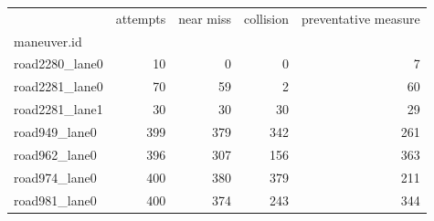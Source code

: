 \begin{tabular}{lrrrr}
\toprule
 & attempts & near miss & collision & preventative measure \\
maneuver.id &  &  &  &  \\
\midrule
road2280_lane0 & 10 & 0 & 0 & 7 \\
road2281_lane0 & 70 & 59 & 2 & 60 \\
road2281_lane1 & 30 & 30 & 30 & 29 \\
road949_lane0 & 399 & 379 & 342 & 261 \\
road962_lane0 & 396 & 307 & 156 & 363 \\
road974_lane0 & 400 & 380 & 379 & 211 \\
road981_lane0 & 400 & 374 & 243 & 344 \\
\bottomrule
\end{tabular}
